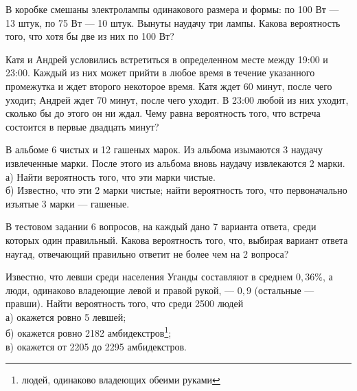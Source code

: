 \newpage\setcounter{zad}{0}



\begin{zkrW}{20}\noindent 
	В коробке смешаны электролампы одинакового размера и формы: по 100 Вт --- 13 штук, по 75 Вт --- 10 штук. Вынуты наудачу три лампы. Какова вероятность того, что хотя бы две из них по 100 Вт?
 
\end{zkrW}

\begin{zkrW}{20}\noindent 
	Катя и Андрей условились встретиться в определенном месте между 19:00 и 23:00. Каждый из них может прийти в любое время в течение указанного промежутка и ждет второго некоторое время. Катя ждет 60 минут, после чего уходит; Андрей ждет 70 минут, после чего уходит. В 23:00 любой из них уходит, сколько бы до этого он ни ждал. Чему равна вероятность того, что встреча состоится в первые двадцать минут?
 
\end{zkrW}

\begin{zkrW}{20}\noindent 
	В альбоме 6 чистых и 12 гашеных марок. Из альбома изымаются 3 наудачу извлеченные марки. После этого из альбома вновь наудачу извлекаются 2 марки. \\ \indent а) Найти вероятность того, что эти марки чистые. \\ \indent б) Известно, что эти 2 марки чистые; найти вероятность того, что первоначально изъятые 3 марки --- гашеные.
 
\end{zkrW}

\begin{zkrW}{20}\noindent 
	В тестовом задании 6 вопросов, на каждый дано 7 варианта ответа, среди которых один правильный. Какова вероятность того, что, выбирая вариант ответа наугад, отвечающий правильно ответит не более чем на 2 вопроса?
 
\end{zkrW}

\begin{zkrW}{20}\noindent 
	Известно, что левши среди населения Уганды составляют в среднем $0{,}36\%$, а люди, одинаково владеющие левой и правой рукой, --- $0{,}9$ (остальные --- правши). Найти вероятность того, что среди 2500 людей \\ \indent а) окажется ровно 5 левшей; \\ \indent б) окажется ровно 2182 амбидекстров\footnote{людей, одинаково владеющих обеими руками}; \\ \indent в) окажется от 2205 до 2295 амбидекстров.
 
\end{zkrW}

